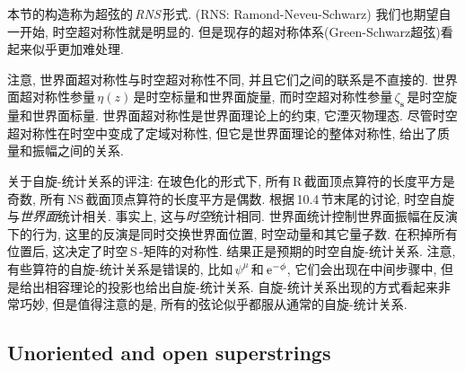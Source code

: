本节的构造称为超弦的\,\emph{RNS}\,形式. (RNS: Ramond-Neveu-Schwarz) 我们也期望自一开始, 时空超对称性就是明显的. 但是现存的超对称体系(Green-Schwarz超弦)看起来似乎更加难处理.

注意, 世界面超对称性与时空超对称性不同, 并且它们之间的联系是不直接的. 世界面超对称性参量$\,\eta(z)\,$是时空标量和世界面旋量, 而时空超对称性参量$\,\zeta_{\mathbf{s}}\,$是时空旋量和世界面标量. 世界面超对称性是世界面理论上的约束, 它湮灭物理态. 尽管时空超对称性在时空中变成了定域对称性, 但它是世界面理论的整体对称性, 给出了质量和振幅之间的关系. 

关于自旋-统计关系的评注: 在玻色化的形式下, 所有\,R\,截面顶点算符的长度平方是奇数, 所有\,NS\,截面顶点算符的长度平方是偶数. 根据\,10.4\,节末尾的讨论, 时空自旋与{\emph{世界面}}统计相关. 事实上, 这与{\emph{时空}}统计相同. 世界面统计控制世界面振幅在反演下的行为, 这里的反演是同时交换世界面位置, 时空动量和其它量子数. 在积掉所有位置后, 这决定了时空\,S\,-矩阵的对称性. 结果正是预期的时空自旋-统计关系. 注意, 有些算符的自旋-统计关系是错误的, 比如\,$\psi^{\mu}\,$和$\,\mathrm{e}^{-\phi}$, 它们会出现在中间步骤中, 但是给出相容理论的投影也给出自旋-统计关系. 自旋-统计关系出现的方式看起来非常巧妙, 但是值得注意的是, 所有的弦论似乎都服从通常的自旋-统计关系.  


\subsection*{Unoriented and open superstrings}

